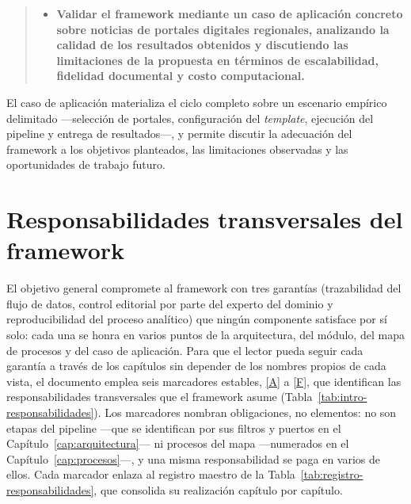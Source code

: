 \documentclass[12pt]{report}
\DeclareRobustCommand{\resp}[1]{\hyperref[tab:registro-responsabilidades]{\textcolor{respcolor}{[#1]}}}
\begin{document}
\vspace{0.3 cm}

\begin{quote}
  \begin{itemize}
    \item [OE4:] \textbf{Validar el framework mediante un caso de aplicación concreto sobre noticias de portales digitales regionales, analizando la calidad de los resultados obtenidos y discutiendo las limitaciones de la propuesta en términos de escalabilidad, fidelidad documental y costo computacional.}
  \end{itemize}
\end{quote}

\vspace{0.3 cm}

El caso de aplicación materializa el ciclo completo sobre un escenario empírico delimitado ---selección de portales, configuración del \textit{template}, ejecución del pipeline y entrega de resultados---, y permite discutir la adecuación del framework a los objetivos planteados, las limitaciones observadas y las oportunidades de trabajo futuro.

\section{Responsabilidades transversales del framework}
\label{sec:intro-responsabilidades}

El objetivo general compromete al framework con tres garantías (trazabilidad del flujo de datos, control editorial por parte del experto del dominio y reproducibilidad del proceso analítico) que ningún componente satisface por sí solo: cada una se honra en varios puntos de la arquitectura, del módulo, del mapa de procesos y del caso de aplicación. Para que el lector pueda seguir cada garantía a través de los capítulos sin depender de los nombres propios de cada vista, el documento emplea seis marcadores estables, \resp{A} a \resp{F}, que identifican las responsabilidades transversales que el framework asume (Tabla~\ref{tab:intro-responsabilidades}). Los marcadores nombran obligaciones, no elementos: no son etapas del pipeline ---que se identifican por sus filtros y puertos en el Capítulo~\ref{cap:arquitectura}--- ni procesos del mapa ---numerados en el Capítulo~\ref{cap:procesos}---, y una misma responsabilidad se paga en varios de ellos. Cada marcador enlaza al registro maestro de la Tabla~\ref{tab:registro-responsabilidades}, que consolida su realización capítulo por capítulo.
\end{document}
